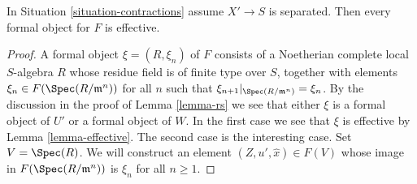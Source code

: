 \begin{lemma}
\label{lemma-formal-object-effective}
In Situation \ref{situation-contractions} assume $X' \to S$ is separated.
Then every formal object for $F$ is effective.
\end{lemma}

\begin{proof}
A formal object $\xi = (R, \xi_n)$ of $F$ consists of a Noetherian
complete local $S$-algebra $R$ whose residue field is of finite type
over $S$, together with elements $\xi_n \in F(\Spec(R/\mathfrak m^n))$
for all $n$ such that $\xi_{n + 1}|_{\Spec(R/\mathfrak m^n)} = \xi_n$.
By the discussion in the proof of Lemma \ref{lemma-rs}
we see that either $\xi$ is a formal object of $U'$ or a formal
object of $W$. In the first case we see that $\xi$ is effective
by Lemma \ref{lemma-effective}. The second case is the interesting case.
Set $V = \Spec(R)$. We will construct an element
$(Z, u', \hat x) \in F(V)$ whose image in $F(\Spec(R/\mathfrak m^n))$
is $\xi_n$ for all $n \geq 1$.


\end{proof}
